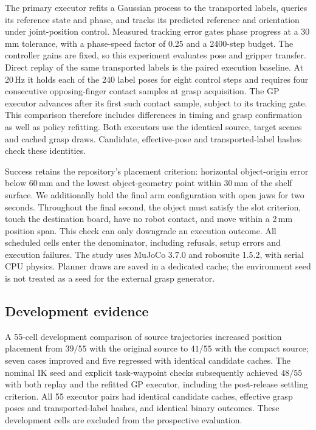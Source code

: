 The primary executor refits a Gaussian process to the transported labels,
queries its reference state and phase, and tracks its predicted reference and
orientation under joint-position control. Measured tracking error gates phase
progress at a 30\,mm tolerance, with a phase-speed factor of 0.25 and a
2400-step budget. The controller gains are fixed, so this experiment evaluates
pose and gripper transfer. Direct replay of the same transported labels is the
paired execution baseline. At 20\,Hz it holds each of the 240 label poses for
eight control steps and requires four consecutive opposing-finger contact
samples at grasp acquisition. The GP executor advances after its first such
contact sample, subject to its tracking gate. This comparison therefore includes
differences in timing and grasp confirmation as well as policy refitting.
Both executors use the identical source, target
scenes and cached grasp draws. Candidate, effective-pose and transported-label
hashes check these identities.

Success retains the repository's placement criterion: horizontal object-origin
error below 60\,mm and the lowest object-geometry point within 30\,mm of the
shelf surface. We additionally hold the final arm configuration with open jaws
for two seconds. Throughout the final second, the object must satisfy the slot
criterion, touch the destination board, have no robot contact, and move within
a 2\,mm position span. This check can only downgrade an execution outcome.
All scheduled cells enter the denominator, including refusals, setup errors and
execution failures. The study uses MuJoCo 3.7.0 and robosuite 1.5.2, with serial
CPU physics. Planner draws are saved in a dedicated cache; the environment seed
is not treated as a seed for the external grasp generator.

\subsection{Development evidence}
A 55-cell development comparison of source trajectories increased position
placement from $39/55$ with the original source to $41/55$ with the compact
source; seven cases improved and five regressed with identical candidate
caches. The nominal IK seed and explicit task-waypoint checks subsequently
achieved $48/55$ with both replay and the refitted GP executor, including the
post-release settling criterion. All 55 executor pairs had identical candidate
caches, effective grasp poses and transported-label hashes, and identical binary
outcomes. These development cells are excluded from the prospective evaluation.

